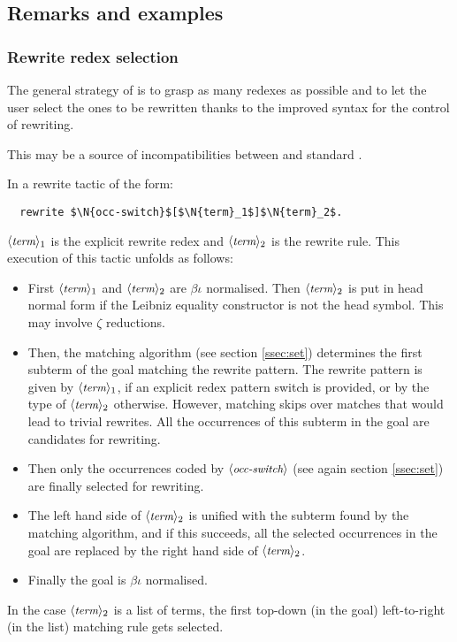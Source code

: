 \subsection{Remarks and examples}\label{ssec:rwex}

\subsubsection*{Rewrite redex selection}
The general strategy of \ssr{}
is to grasp as many redexes as possible and to let the user select the
ones to be rewritten thanks to the improved syntax for the control of
rewriting.

This may be a source of incompatibilities between \ssr{} and standard
\Coq{}.

In a rewrite tactic of the form:
\begin{lstlisting}
  rewrite $\N{occ-switch}$[$\N{term}_1$]$\N{term}_2$.
\end{lstlisting}
$\langle\mbox{\itshape\rmfamily\small term}\rangle_1$ is the explicit rewrite redex and 
$\langle\mbox{\itshape\rmfamily\small term}\rangle_2$ is the
rewrite rule. This execution of this tactic unfolds as follows:

\begin{itemize}
\item First $\langle\mbox{\itshape\rmfamily\small term}\rangle_1$ and $\langle\mbox{\itshape\rmfamily\small term}\rangle_2$ are $\beta\iota$ normalised. Then
  $\langle\mbox{\itshape\rmfamily\small term}\rangle_2$ is put in head normal form if the Leibniz equality
  constructor  is not the head symbol. This may involve $\zeta$
  reductions.
\item Then, the matching algorithm (see section \ref{ssec:set})
  determines the first subterm of the goal matching the rewrite pattern.
  The rewrite pattern is
  given by $\langle\mbox{\itshape\rmfamily\small term}\rangle_1$, if an explicit redex pattern switch is provided, or by
  the type of $\langle\mbox{\itshape\rmfamily\small term}\rangle_2$ otherwise. However, matching skips over
  matches that would lead to trivial rewrites. All the
  occurrences of this subterm in the goal are candidates for rewriting.
\item Then only the occurrences coded by $\langle\mbox{\itshape\rmfamily\small occ-switch}\rangle$ (see again
  section \ref{ssec:set}) are finally selected for rewriting.
\item The left hand side of $\langle\mbox{\itshape\rmfamily\small term}\rangle_2$ is unified with the subterm found
  by the matching algorithm, and if this succeeds, all the selected
  occurrences in the goal are replaced by the right hand side of
  $\langle\mbox{\itshape\rmfamily\small term}\rangle_2$.
\item Finally the goal is $\beta\iota$ normalised.
\end{itemize}

In the case $\langle\mbox{\itshape\rmfamily\small term}\rangle_2$ is a list of terms, the first top-down (in
the goal) left-to-right (in the list) matching rule gets selected.


